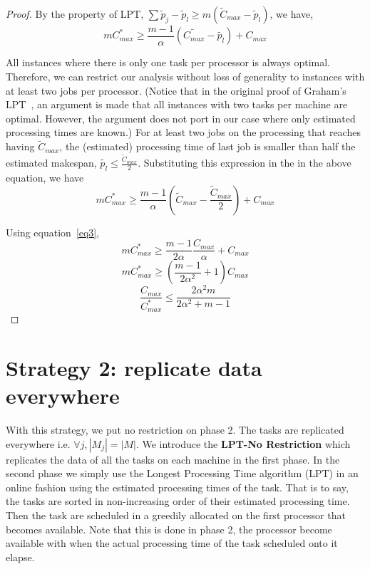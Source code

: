 \documentclass[10pt, conference, compsocconf]{IEEEtran}
\begin{document}
\begin{proof}
 By the property of LPT, $\sum \tilde p_j-\tilde p_l \geq m (\tilde C_{max}-\tilde p_l)$, we have,
\begin{equation}\nonumber 
  m C_{max}^{*}\geq \frac{m-1}{\alpha } \left( \tilde{C_{max}} - \tilde{ p_l} \right) + {C_{max}}
 \end{equation}
 
 All instances where there is only one task per processor is always
 optimal. Therefore, we can restrict our analysis without loss of
 generality to instances with at least two jobs per processor. (Notice
 that in the original proof of Graham's LPT~\cite{Graham69boundson},
 an argument is made that all instances with two tasks per machine are
 optimal. However, the argument does not port in our case where only
 estimated processing times are known.) For at least two jobs on the
 processing that reaches having $\tilde{C}_{max}$, the (estimated)
 processing time of last job is smaller than half the estimated
 makespan, $\tilde{p_l} \leq \frac{\tilde{C}_{max}}{2}$. Substituting
 this expression in the in the above equation, we have
\begin{equation}\nonumber
 m C_{max}^{*}\geq \frac{m-1}{\alpha } \left( \tilde C_{max}-\frac{\tilde C_{max}}{2} \right ) + {C_{max}}
\end{equation}

Using equation~\ref{eq3},
\begin{equation}\nonumber
 m C_{max}^{*}\geq \frac{m-1}{2\alpha } \frac{C_{max}} {\alpha} + {C_{max}}
\end{equation}
\begin{equation}\nonumber
 m C_{max}^{*}\geq \left( \frac{m-1}{2\alpha^{2} } +1\right){C_{max}}
\end{equation}
\begin{equation}\nonumber
\frac{C_{max}}{C_{max}^{*}}\leq \frac{2\alpha^{2}m}{2\alpha^{2}+ m-1}
\end{equation}
\end{proof} 

\section{Strategy 2: replicate data everywhere}\label{sec5}

With this strategy, we put no restriction on phase 2. The tasks are
replicated everywhere i.e. $\forall j, |M_{j}|=|M|$. We introduce the
\textbf{LPT-No Restriction} which replicates the data of all the tasks
on each machine in the first phase. In the second phase we simply use
the Longest Processing Time algorithm (LPT) in an online fashion using
the estimated processing times of the task. That is to say, the tasks
are sorted in non-increasing order of their estimated processing
time. Then the task are scheduled in a greedily allocated on the first
processor that becomes available. Note that this is done in phase 2,
the processor become available with when the actual processing time of
the task scheduled onto it elapse.
\end{document}

